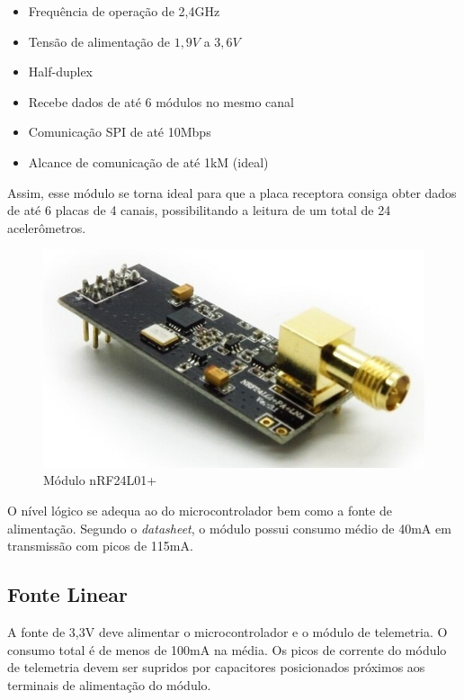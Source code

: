 \documentclass[
	12pt,				%
	openright,			%
	twoside,			%
	a4paper,			%
	english,			%
	french,				%
	spanish,			%
	brazil,				%
	]{abntex2}
\begin{document}
			\begin{itemize}
				\item Frequência de operação de 2,4GHz
				\item Tensão de alimentação de $1,9V$ a $3,6V$
				\item Half-duplex
				\item Recebe dados de até 6 módulos no mesmo canal
				\item Comunicação SPI de até 10Mbps
				\item Alcance de comunicação de até 1kM (ideal)
			\end{itemize}

			Assim, esse módulo se torna ideal para que a placa receptora consiga
			obter dados de até 6 placas de 4 canais, possibilitando a leitura de
			um total de 24 acelerômetros.

			\begin{figure}[!ht]
				\centering
				\includegraphics[scale = 0.6]{../Fotos/nrf.jpg}
				\caption[Módulo nRF24L01+]{Módulo nRF24L01+ \footnotemark}
			\end{figure}


			O nível lógico se adequa ao do microcontrolador bem como a fonte
			de alimentação. Segundo o \textit{datasheet}, o módulo possui
			consumo médio de 40mA em transmissão com picos de 115mA.

		\subsection{Fonte Linear}
			A fonte de 3,3V deve alimentar o microcontrolador e o módulo de
			telemetria. O consumo total é de menos de 100mA na média. Os
			picos de corrente do módulo de telemetria devem ser supridos por
			capacitores posicionados próximos aos terminais de alimentação
			do módulo.
\end{document}
